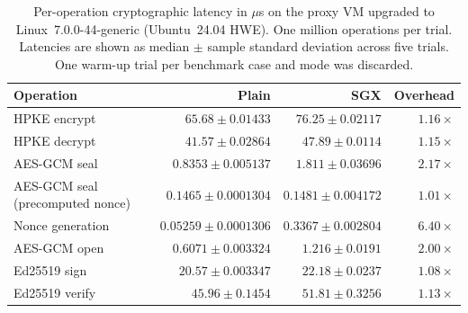 \begin{table}[H]
\centering
\small
\setlength{\tabcolsep}{4pt}
\begin{tabular}{lrrr}
\toprule
Operation & Plain & SGX & Overhead \\
\midrule
HPKE encrypt & $65.68 \pm 0.01433$ & $76.25 \pm 0.02117$ & $1.16\times$ \\
HPKE decrypt & $41.57 \pm 0.02864$ & $47.89 \pm 0.0114$ & $1.15\times$ \\
AES-GCM seal & $0.8353 \pm 0.005137$ & $1.811 \pm 0.03696$ & $2.17\times$ \\
\quad AES-GCM seal (precomputed nonce) & $0.1465 \pm 0.0001304$ & $0.1481 \pm 0.004172$ & $1.01\times$ \\
\quad Nonce generation & $0.05259 \pm 0.0001306$ & $0.3367 \pm 0.002804$ & $6.40\times$ \\
AES-GCM open & $0.6071 \pm 0.003324$ & $1.216 \pm 0.0191$ & $2.00\times$ \\
Ed25519 sign & $20.57 \pm 0.003347$ & $22.18 \pm 0.0237$ & $1.08\times$ \\
Ed25519 verify & $45.96 \pm 0.1454$ & $51.81 \pm 0.3256$ & $1.13\times$ \\
\bottomrule
\end{tabular}
\caption{Per-operation cryptographic latency in ${}\mu$s on the proxy VM upgraded to Linux~7.0.0-44-generic (Ubuntu~24.04 HWE). One million operations per trial. Latencies are shown as median $\pm$ sample standard deviation across five trials. One warm-up trial per benchmark case and mode was discarded.}
\label{tab:reproduction-table4-1m-kernel7}
\end{table}
